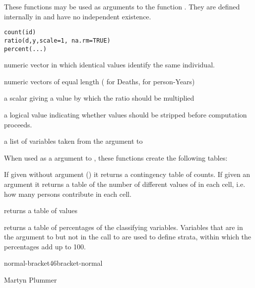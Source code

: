 \begin{Description}\relax
These functions may be used as  arguments to the
function . They are defined internally in
 and have no independent existence.
\end{Description}
\begin{Usage}
\begin{verbatim}
count(id)
ratio(d,y,scale=1, na.rm=TRUE)
percent(...)
\end{verbatim}
\end{Usage}
\begin{Arguments}
\begin{ldescription}
\item[\code{id}] numeric vector in which identical values identify the
same individual.
\item[\code{d, y}] numeric vectors of equal length ( for Deaths,
 for person-Years)
\item[\code{scale}] a scalar giving a value by which the ratio should be
multiplied
\item[\code{na.rm}] a logical value indicating whether  values should
be stripped before computation proceeds.
\item[\code{...}] a list of variables taken from the  argument
to 
\end{ldescription}
\end{Arguments}
\begin{Value}
When used as a  argument to , these
functions create the following tables:
\begin{ldescription}
\item[\code{this-is-escaped-codenormal-bracket30bracket-normal}] If given without argument () it
returns a contingency table of counts. If given an 
argument it returns a table of the number of different values of
 in each cell, i.e. how many persons contribute in each
cell.
\item[\code{this-is-escaped-codenormal-bracket36bracket-normal}] returns a table of values
\item[\code{this-is-escaped-codenormal-bracket40bracket-normal}] returns a table of percentages of the
classifying variables. Variables that are in the 
argument to  but not in the call to
 are used to define strata, within which the
percentages add up to 100.
\end{ldescription}

normal-bracket46bracket-normal
\end{Value}
\begin{Author}\relax
Martyn Plummer
\end{Author}
\begin{SeeAlso}\relax
{}
\end{SeeAlso}

